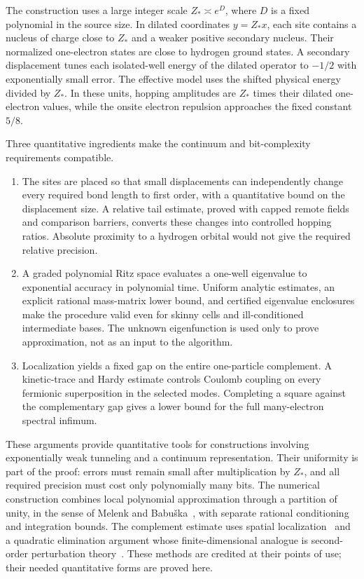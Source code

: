 The construction uses a large integer scale $Z_*\asymp e^D$, where $D$ is a fixed polynomial in the source size. In dilated coordinates $y=Z_*x$, each site contains a nucleus of charge close to $Z_*$ and a weaker positive secondary nucleus. Their normalized one-electron states are close to hydrogen ground states. A secondary displacement tunes each isolated-well energy of the dilated operator to $-1/2$ with exponentially small error. The effective model uses the shifted physical energy divided by $Z_*$. In these units, hopping amplitudes are $Z_*$ times their dilated one-electron values, while the onsite electron repulsion approaches the fixed constant $5/8$.

Three quantitative ingredients make the continuum and bit-complexity requirements compatible.

\begin{enumerate}[label=(\roman*)]
\item The sites are placed so that small displacements can independently change every required bond length to first order, with a quantitative bound on the displacement size. A relative tail estimate, proved with capped remote fields and comparison barriers, converts these changes into controlled hopping ratios. Absolute proximity to a hydrogen orbital would not give the required relative precision.
\item A graded polynomial Ritz space evaluates a one-well eigenvalue to exponential accuracy in polynomial time. Uniform analytic estimates, an explicit rational mass-matrix lower bound, and certified eigenvalue enclosures make the procedure valid even for skinny cells and ill-conditioned intermediate bases. The unknown eigenfunction is used only to prove approximation, not as an input to the algorithm.
\item Localization yields a fixed gap on the entire one-particle complement. A kinetic-trace and Hardy estimate controls Coulomb coupling on every fermionic superposition in the selected modes. Completing a square against the complementary gap gives a lower bound for the full many-electron spectral infimum.
\end{enumerate}

These arguments provide quantitative tools for constructions involving exponentially weak tunneling and a continuum representation. Their uniformity is part of the proof: errors must remain small after multiplication by $Z_*$, and all required precision must cost only polynomially many bits. The numerical construction combines local polynomial approximation through a partition of unity, in the sense of Melenk and Babu\v{s}ka~\cite{MelenkBabuska1996}, with separate rational conditioning and integration bounds. The complement estimate uses spatial localization~\cite{Simon1983} and a quadratic elimination argument whose finite-dimensional analogue is second-order perturbation theory~\cite{BravyiDiVincenzoLoss2011}. These methods are credited at their points of use; their needed quantitative forms are proved here.


